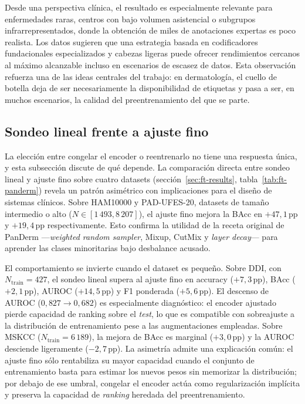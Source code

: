 Desde una perspectiva clínica, el resultado es especialmente relevante
para enfermedades raras, centros con bajo volumen asistencial o
subgrupos infrarrepresentados, donde la obtención de miles de
anotaciones expertas es poco realista. Los datos sugieren que una
estrategia basada en codificadores fundacionales especializados y
cabezas ligeras puede ofrecer rendimientos cercanos al máximo alcanzable
incluso en escenarios de escasez de datos. Esta observación refuerza una
de las ideas centrales del trabajo: en dermatología, el cuello de
botella deja de ser necesariamente la disponibilidad de etiquetas y pasa
a ser, en muchos escenarios, la calidad del preentrenamiento del que se
parte.

\subsection{Sondeo lineal frente a ajuste fino}
\label{sec:disc-lp-vs-ft}

La elección entre congelar el encoder o reentrenarlo no tiene una
respuesta única, y esta subsección discute de qué depende. La
comparación directa entre sondeo lineal y ajuste fino sobre cuatro
datasets (sección~\ref{sec:ft-results},
tabla~\ref{tab:ft-panderm}) revela un patrón asimétrico con
implicaciones para el diseño de sistemas clínicos. Sobre HAM10000 y
PAD-UFES-20, datasets de tamaño intermedio o alto
($N \in [1\,493, 8\,207]$), el ajuste fino mejora la BAcc en
$+47{,}1$\,pp y $+19{,}4$\,pp respectivamente. Esto confirma la
utilidad de la receta original de PanDerm ---\emph{weighted random
sampler}, Mixup, CutMix y \emph{layer decay}--- para aprender las
clases minoritarias bajo desbalance acusado.

El comportamiento se invierte cuando el dataset es pequeño. Sobre
DDI, con $N_{\mathrm{train}} = 427$, el sondeo lineal supera al
ajuste fino en accuracy ($+7{,}3$\,pp), BAcc ($+2{,}1$\,pp),
AUROC ($+14{,}5$\,pp) y F1 ponderada ($+5{,}6$\,pp). El
descenso de AUROC ($0{,}827 \to 0{,}682$) es especialmente
diagnóstico: el encoder ajustado pierde capacidad de ranking sobre
el \emph{test}, lo que es compatible con sobreajuste a la
distribución de entrenamiento pese a las augmentaciones empleadas.
Sobre MSKCC ($N_{\mathrm{train}} = 6\,189$), la mejora de BAcc es
marginal ($+3{,}0$\,pp) y la AUROC desciende ligeramente
($-2{,}7$\,pp). La asimetría admite una explicación común: el ajuste
fino sólo rentabiliza su mayor capacidad cuando el conjunto de
entrenamiento basta para estimar los nuevos pesos sin memorizar la
distribución; por debajo de ese umbral, congelar el encoder actúa como
regularización implícita y preserva la capacidad de \emph{ranking}
heredada del preentrenamiento.


